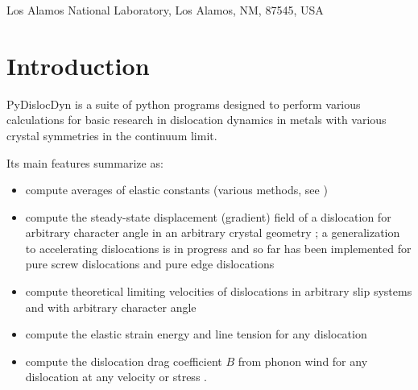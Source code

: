 \documentclass[11pt,letterpaper,oneside]{article}
\title{\texorpdfstring{\begin{flushright}
			{\small LA-UR-22-28074}
		\end{flushright}\vspace{2em}}{}%
	PyDislocDyn --- Code Manual}
\author{Daniel N. Blaschke}
\date{November 5, 2026}
\begin{document}
\maketitle

\thispagestyle{empty}
\begin{center}
	\vspace{-0.3cm}
	Los Alamos National Laboratory, Los Alamos, NM, 87545, USA
	\\[0.5cm]
	{}
\end{center}

\tableofcontents
\pagebreak

\section{Introduction}

PyDislocDyn \cite{pydislocdyn,Blaschke:2025joss} is a suite of python programs designed to perform various calculations for basic research in dislocation dynamics in metals with various crystal symmetries in the continuum limit.

Its main features summarize as:
\begin{itemize}
\item compute averages of elastic constants (various methods, see \cite{Blaschke:2017Poly})
\item compute the steady-state displacement (gradient) field of a dislocation for arbitrary character angle in an arbitrary crystal geometry \cite{Bacon:1980,Hirth:1982}; a generalization to accelerating dislocations is in progress and so far has been implemented for pure screw dislocations \cite{Blaschke:2020acc} and pure edge dislocations \cite{Blaschke:2023acc}
\item compute theoretical limiting velocities of dislocations in arbitrary slip systems and with arbitrary character angle \cite{Blaschke:2026vlim,Blaschke:2021vcrit,Blaschke:2020MD,Teutonico:1961,Barnett:1973b}
\item compute the elastic strain energy and line tension for any dislocation \cite{Blaschke:2017lten}
\item compute the dislocation drag coefficient $B$ from phonon wind for any dislocation at any velocity \cite{Alshits:1979,Alshits:1992,Blaschke:BpaperRpt,Blaschke:2018anis,Blaschke:2019fits,Blaschke:2019Bpap} or stress \cite{Blaschke:2019a,Blaschke:2021impact,Blaschke:2021temperature}.
\end{itemize}
\end{document}
